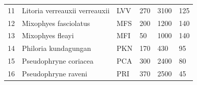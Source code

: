 \begin{table}[htb!]
{\begin{tabular}{llllll}
11        & Litoria verreauxii verreauxii & LVV                & 270                                                                              & 3100                                                                 & 125                                                                              \\ 
12        & Mixophyes fasciolatus         & MFS                & 200                                                                              & 1200                                                                 & 140                                                                              \\ 
13        & Mixophyes fleayi              & MFI                & 50                                                                               & 1000                                                                 & 140                                                                              \\ 
14        & Philoria kundagungan          & PKN                & 170                                                                              & 430                                                                  & 95                                                                               \\ 
15        & Pseudophryne coriacea         & PCA                & 300                                                                              & 2400                                                                 & 80                                                                               \\
16        & Pseudophryne raveni           & PRI                & 370                                                                              & 2500                                                                 & 45                                                                               \\ 

\end{tabular}}
\end{table}
